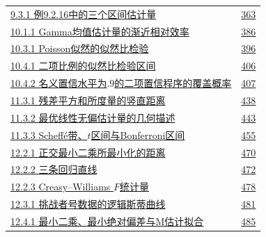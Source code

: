 \begin{longtable}{@{}p{}r@{}}
\hyperref[fig:9.3.1]{9.3.1 例9.2.16中的三个区间估计量} & \hyperref[fig:9.3.1]{363} \\
\hyperref[fig:10.1.1]{10.1.1 Gamma均值估计量的渐近相对效率} & \hyperref[fig:10.1.1]{386} \\
\hyperref[fig:10.3.1]{10.3.1 Poisson似然的似然比检验} & \hyperref[fig:10.3.1]{396} \\
\hyperref[fig:10.4.1]{10.4.1 二项比例的似然比检验区间} & \hyperref[fig:10.4.1]{406} \\
\hyperref[fig:10.4.2]{10.4.2 名义置信水平为$.9$的二项置信程序的覆盖概率} & \hyperref[fig:10.4.2]{407} \\
\hyperref[fig:11.3.1]{11.3.1 残差平方和所度量的竖直距离} & \hyperref[fig:11.3.1]{438} \\
\hyperref[fig:11.3.2]{11.3.2 最优线性无偏估计量的几何描述} & \hyperref[fig:11.3.2]{443} \\
\hyperref[fig:11.3.3]{11.3.3 Scheffé带、$t$区间与Bonferroni区间} & \hyperref[fig:11.3.3]{455} \\
\hyperref[fig:12.2.1]{12.2.1 正交最小二乘所最小化的距离} & \hyperref[fig:12.2.1]{470} \\
\hyperref[fig:12.2.2]{12.2.2 三条回归直线} & \hyperref[fig:12.2.2]{472} \\
\hyperref[fig:12.2.3]{12.2.3 Creasy–Williams $F$统计量} & \hyperref[fig:12.2.3]{478} \\
\hyperref[fig:12.3.1]{12.3.1 挑战者号数据的逻辑斯蒂曲线} & \hyperref[fig:12.3.1]{481} \\
\hyperref[fig:12.4.1]{12.4.1 最小二乘、最小绝对偏差与M估计拟合} & \hyperref[fig:12.4.1]{485} \\
\end{longtable}\endgroup

